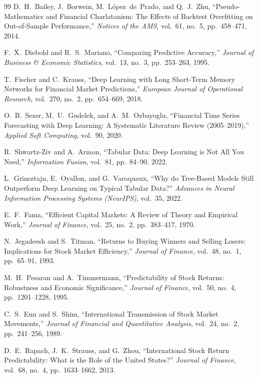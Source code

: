 \begin{thebibliography}{99}
D.~H.~Bailey, J.~Borwein, M.~L\'opez~de~Prado, and Q.~J.~Zhu, ``Pseudo-Mathematics and Financial Charlatanism: The Effects of Backtest Overfitting on Out-of-Sample Performance,'' \textit{Notices of the AMS}, vol.~61, no.~5, pp.~458--471, 2014.

F.~X.~Diebold and R.~S.~Mariano, ``Comparing Predictive Accuracy,'' \textit{Journal of Business \& Economic Statistics}, vol.~13, no.~3, pp.~253--263, 1995.

T.~Fischer and C.~Krauss, ``Deep Learning with Long Short-Term Memory Networks for Financial Market Predictions,'' \textit{European Journal of Operational Research}, vol.~270, no.~2, pp.~654--669, 2018.

O.~B.~Sezer, M.~U.~Gudelek, and A.~M.~Ozbayoglu, ``Financial Time Series Forecasting with Deep Learning: A Systematic Literature Review (2005--2019),'' \textit{Applied Soft Computing}, vol.~90, 2020.

R.~Shwartz-Ziv and A.~Armon, ``Tabular Data: Deep Learning is Not All You Need,'' \textit{Information Fusion}, vol.~81, pp.~84--90, 2022.

L.~Grinsztajn, E.~Oyallon, and G.~Varoquaux, ``Why do Tree-Based Models Still Outperform Deep Learning on Typical Tabular Data?'' \textit{Advances in Neural Information Processing Systems (NeurIPS)}, vol.~35, 2022.

E.~F.~Fama, ``Efficient Capital Markets: A Review of Theory and Empirical Work,'' \textit{Journal of Finance}, vol.~25, no.~2, pp.~383--417, 1970.

N.~Jegadeesh and S.~Titman, ``Returns to Buying Winners and Selling Losers: Implications for Stock Market Efficiency,'' \textit{Journal of Finance}, vol.~48, no.~1, pp.~65--91, 1993.

M.~H.~Pesaran and A.~Timmermann, ``Predictability of Stock Returns: Robustness and Economic Significance,'' \textit{Journal of Finance}, vol.~50, no.~4, pp.~1201--1228, 1995.

C.~S.~Eun and S.~Shim, ``International Transmission of Stock Market Movements,'' \textit{Journal of Financial and Quantitative Analysis}, vol.~24, no.~2, pp.~241--256, 1989.

D.~E.~Rapach, J.~K.~Strauss, and G.~Zhou, ``International Stock Return Predictability: What is the Role of the United States?'' \textit{Journal of Finance}, vol.~68, no.~4, pp.~1633--1662, 2013.


\end{thebibliography}
